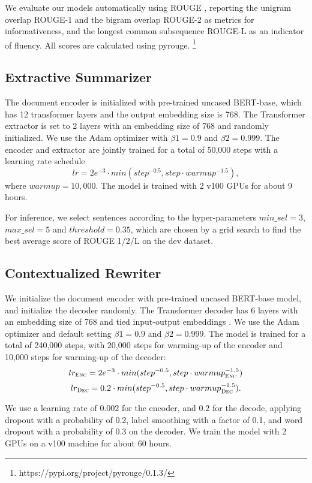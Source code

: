 \documentclass[letterpaper]{article} %
\begin{document}
We evaluate our models automatically using ROUGE \cite{Lin2004}, reporting the unigram overlap ROUGE-1 and the bigram overlap ROUGE-2 as metrics for informativeness, and the longest common subsequence ROUGE-L as an indicator of fluency. All scores are calculated using pyrouge. \footnote{https://pypi.org/project/pyrouge/0.1.3/}

\subsection{Extractive Summarizer}
The document encoder is initialized with pre-trained uncased BERT-base, which has 12 transformer layers and the output embedding size is 768. The Transformer extractor is set to 2 layers with an embedding size of 768 and randomly initialized. We use the Adam optimizer \cite{Kingma2015} with $\beta1=0.9$ and $\beta2=0.999$. The encoder and extractor are jointly trained for a total of 50,000 steps with a learning rate schedule \cite{Vaswani2017}
\[
lr = 2e^{-3} \cdot min(step^{-0.5}, step \cdot warmup^{-1.5}),
\]
where $warmup=10,000$. The model is trained with 2 v100 GPUs for about 9 hours.

For inference, we select sentences according to the hyper-parameters $min\_sel=3$, $max\_sel=5$ and $threshold=0.35$, which are chosen by a grid search to find the best average score of ROUGE 1/2/L on the dev dataset.


\subsection{Contextualized Rewriter}
We initialize the document encoder with pre-trained uncased BERT-base model, and initialize the decoder randomly. The Transformer decoder has 6 layers with an embedding size of 768 and tied input-output embeddings \cite{Press2017}. We use the Adam optimizer and default setting $\beta1=0.9$ and $\beta2=0.999$. The model is trained for a total of 240,000 steps, with 20,000 steps for warming-up of the encoder and 10,000 steps for warming-up of the decoder:
\[
lr_{\textsc{Enc}}=2e^{-3} \cdot min(step^{-0.5}, step \cdot warmup_{\textsc{Enc}}^{-1.5})
\]
\[
lr_{\textsc{Dec}}=0.2 \cdot min(step^{-0.5}, step \cdot warmup_{\textsc{Dec}}^{-1.5}).
\]

We use a learning rate of $0.002$ for the encoder, and $0.2$ for the decode, applying dropout with a probability of 0.2, label smoothing \cite{Szegedy2016} with a factor of 0.1, and word dropout \cite{Bowman2016} with a probability of 0.3 on the decoder. We train the model with 2 GPUs on a v100 machine for about 60 hours.
\end{document}

